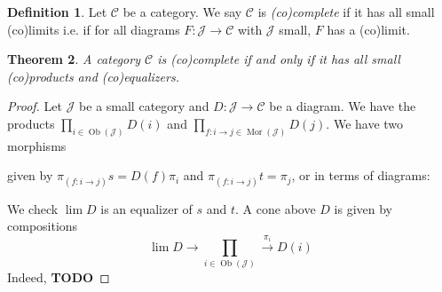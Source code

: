 \documentclass{article}
\newcommand{\cat}{\mathcal{C}}
\newcommand{\Jcat}{\mathcal{J}}
\DeclareMathOperator{\Ob}{Ob}
\DeclareMathOperator{\Mor}{Mor}
\newcommand{\todo}{\textbf{TODO}}
\theoremstyle{plain}
\newtheorem{theorem}{Theorem}[section]
\theoremstyle{definition}
\newtheorem{definition}[theorem]{Definition}
\theoremstyle{remark}
\begin{document}
\begin{definition}
    Let $\cat$ be a category. We say $\cat$ is \emph{(co)complete} if it has all small (co)limits i.e. if for all diagrams $F : \Jcat \to \cat$ with $\Jcat$ small, $F$ has a (co)limit.
\end{definition}

\begin{theorem}
    A category $\cat$ is (co)complete if and only if it has all small (co)products and (co)equalizers.
\end{theorem}

\begin{proof}
    Let $\Jcat$ be a small category and $D : \Jcat \to \cat$ be a diagram. We have the products $\prod\limits_{i \in \Ob(\Jcat)} D(i)$ and $\prod\limits_{f : i \to j \in \Mor(\Jcat)} D(j)$. We have two morphisms
    \begin{center}
    \end{center}
    given by $\pi_{(f : i \to j)}s = D(f)\pi_i$ and $\pi_{(f : i \to j)}t = \pi_j$, or in terms of diagrams:
    \begin{center}
        \hspace{1cm}
    \end{center}
    We check $\lim D$ is an equalizer of $s$ and $t$. A cone above $D$ is given by compositions \[\lim D \to \prod\limits_{i \in \Ob(\Jcat)} \xrightarrow{\pi_i} D(i)\]
    Indeed, \todo
\end{proof}
\end{document}
